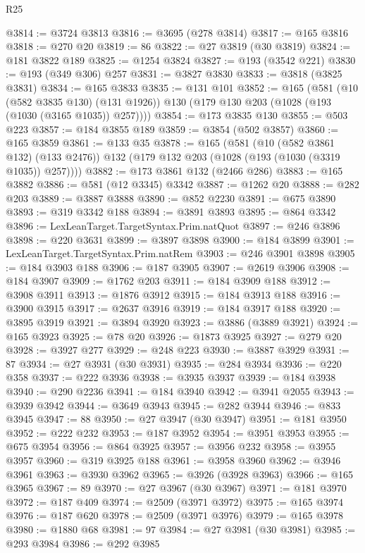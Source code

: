 \begin{lexlean}{R25}
\begin{coremodule}
@3814 := @3724 @3813
@3816 := @3695 (@278 @3814)
@3817 := @165 @3816
@3818 := @270 @20
@3819 := 86
@3822 := @27 @3819 (@30 @3819)
@3824 := @181 @3822 @189
@3825 := @1254 @3824
@3827 := @193 (@3542 @221)
@3830 := @193 (@349 @306) @257
@3831 := @3827 @3830
@3833 := @3818 (@3825 @3831)
@3834 := @165 @3833
@3835 := @131 @101
@3852 := @165
    (@581
      (@10 (@582 @3835 @130) (@131 @1926))
      @130
      (@179 @130 @203 (@1028 (@193 (@1030 (@3165 @1035)) @257))))
@3854 := @173 @3835 @130
@3855 := @503 @223
@3857 := @184 @3855 @189
@3859 := @3854 (@502 @3857)
@3860 := @165 @3859
@3861 := @133 @35
@3878 := @165
    (@581
      (@10 (@582 @3861 @132) (@133 @2476))
      @132
      (@179 @132 @203 (@1028 (@193 (@1030 (@3319 @1035)) @257))))
@3882 := @173 @3861 @132 (@2466 @286)
@3883 := @165 @3882
@3886 := @581 (@12 @3345) @3342
@3887 := @1262 @20
@3888 := @282 @203
@3889 := @3887 @3888
@3890 := @852 @2230
@3891 := @675 @3890
@3893 := @319 @3342 @188
@3894 := @3891 @3893
@3895 := @864 @3342
@3896 := LexLeanTarget.TargetSyntax.Prim.natQuot
@3897 := @246 @3896
@3898 := @220 @3631
@3899 := @3897 @3898
@3900 := @184 @3899
@3901 := LexLeanTarget.TargetSyntax.Prim.natRem
@3903 := @246 @3901 @3898
@3905 := @184 @3903 @188
@3906 := @187 @3905
@3907 := @2619 @3906
@3908 := @184 @3907
@3909 := @1762 @203
@3911 := @184 @3909 @188
@3912 := @3908 @3911
@3913 := @1876 @3912
@3915 := @184 @3913 @188
@3916 := @3900 @3915
@3917 := @2637 @3916
@3919 := @184 @3917 @188
@3920 := @3895 @3919
@3921 := @3894 @3920
@3923 := @3886 (@3889 @3921)
@3924 := @165 @3923
@3925 := @78 @20
@3926 := @1873 @3925
@3927 := @279 @20
@3928 := @3927 @277
@3929 := @248 @223
@3930 := @3887 @3929
@3931 := 87
@3934 := @27 @3931 (@30 @3931)
@3935 := @284 @3934
@3936 := @220 @358
@3937 := @222 @3936
@3938 := @3935 @3937
@3939 := @184 @3938
@3940 := @290 @2236
@3941 := @184 @3940
@3942 := @3941 @2055
@3943 := @3939 @3942
@3944 := @3649 @3943
@3945 := @282 @3944
@3946 := @833 @3945
@3947 := 88
@3950 := @27 @3947 (@30 @3947)
@3951 := @181 @3950
@3952 := @222 @232
@3953 := @187 @3952
@3954 := @3951 @3953
@3955 := @675 @3954
@3956 := @864 @3925
@3957 := @3956 @232
@3958 := @3955 @3957
@3960 := @319 @3925 @188
@3961 := @3958 @3960
@3962 := @3946 @3961
@3963 := @3930 @3962
@3965 := @3926 (@3928 @3963)
@3966 := @165 @3965
@3967 := 89
@3970 := @27 @3967 (@30 @3967)
@3971 := @181 @3970
@3972 := @187 @409
@3974 := @2509 (@3971 @3972)
@3975 := @165 @3974
@3976 := @187 @620
@3978 := @2509 (@3971 @3976)
@3979 := @165 @3978
@3980 := @1880 @68
@3981 := 97
@3984 := @27 @3981 (@30 @3981)
@3985 := @293 @3984
@3986 := @292 @3985

\end{coremodule}
\end{lexlean}
